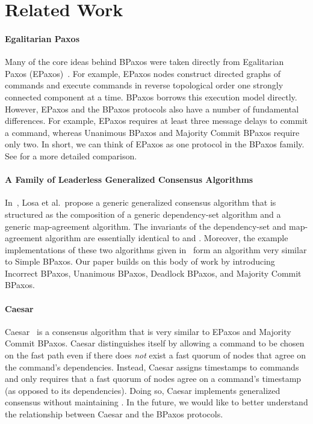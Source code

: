 \section{Related Work}

\paragraph{Egalitarian Paxos}
Many of the core ideas behind BPaxos were taken directly from Egalitarian Paxos
(EPaxos)~\cite{moraru2013there, moraru2013proof}. For example, EPaxos nodes
construct directed graphs of commands and execute commands in reverse
topological order one strongly connected component at a time. BPaxos borrows
this execution model directly. However, EPaxos and the BPaxos protocols also
have a number of fundamental differences.  For example, EPaxos requires at
least three message delays to commit a command, whereas Unanimous BPaxos and
Majority Commit BPaxos require only two.  In short, we can think of EPaxos as
one protocol in the BPaxos family. See  for a more
detailed comparison.

\paragraph{A Family of Leaderless Generalized Consensus Algorithms}
In~\cite{losa2016brief}, Losa et al.\ propose a generic generalized consensus
algorithm that is structured as the composition of a generic dependency-set
algorithm and a generic map-agreement algorithm. The invariants of the
dependency-set and map-agreement algorithm are essentially identical to
 and . Moreover, the
example implementations of these two algorithms given in~\cite{losa2016brief}
form an algorithm very similar to Simple BPaxos. Our paper builds on this body
of work by introducing Incorrect BPaxos, Unanimous BPaxos, Deadlock BPaxos, and
Majority Commit BPaxos.

\paragraph{Caesar}
Caesar~\cite{arun2017speeding} is a consensus algorithm that is very similar to
EPaxos and Majority Commit BPaxos. Caesar distinguishes itself by allowing a
command to be chosen on the fast path even if there does \emph{not} exist a
fast quorum of nodes that agree on the command's dependencies. Instead, Caesar
assigns timestamps to commands and only requires that a fast quorum of nodes
agree on a command's timestamp (as opposed to its dependencies). Doing so,
Caesar implements generalized consensus without maintaining
. In the future, we would like to better understand
the relationship between Caesar and the BPaxos protocols.

